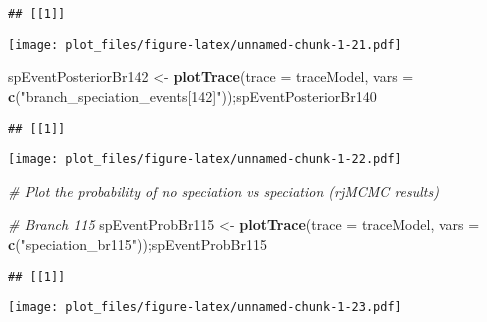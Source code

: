 \documentclass[
]{article}
\newenvironment{Shaded}{\begin{snugshade}}{\end{snugshade}}
\newcommand{\AttributeTok}[1]{\textcolor[rgb]{0.13,0.29,0.53}{#1}}
\newcommand{\CommentTok}[1]{\textcolor[rgb]{0.56,0.35,0.01}{\textit{#1}}}
\newcommand{\FunctionTok}[1]{\textcolor[rgb]{0.13,0.29,0.53}{\textbf{#1}}}
\newcommand{\NormalTok}[1]{#1}
\newcommand{\OtherTok}[1]{\textcolor[rgb]{0.56,0.35,0.01}{#1}}
\newcommand{\StringTok}[1]{\textcolor[rgb]{0.31,0.60,0.02}{#1}}
\begin{document}
\begin{verbatim}
## [[1]]
\end{verbatim}

\texttt{[image: plot\_files/figure-latex/unnamed-chunk-1-21.pdf]}

\begin{Shaded}
\begin{Highlighting}[]
\NormalTok{spEventPosteriorBr142 }\OtherTok{\textless{}{-}} \FunctionTok{plotTrace}\NormalTok{(}\AttributeTok{trace =}\NormalTok{ traceModel, }
                              \AttributeTok{vars =} \FunctionTok{c}\NormalTok{(}\StringTok{"branch\_speciation\_events[142]"}\NormalTok{));spEventPosteriorBr140}
\end{Highlighting}
\end{Shaded}

\begin{verbatim}
## [[1]]
\end{verbatim}

\texttt{[image: plot\_files/figure-latex/unnamed-chunk-1-22.pdf]}

\begin{Shaded}
\begin{Highlighting}[]
\CommentTok{\# Plot the probability of no speciation vs speciation (rjMCMC results)}

\CommentTok{\# Branch 115}
\NormalTok{spEventProbBr115 }\OtherTok{\textless{}{-}} \FunctionTok{plotTrace}\NormalTok{(}\AttributeTok{trace =}\NormalTok{ traceModel, }
                              \AttributeTok{vars =} \FunctionTok{c}\NormalTok{(}\StringTok{"speciation\_br115"}\NormalTok{));spEventProbBr115}
\end{Highlighting}
\end{Shaded}

\begin{verbatim}
## [[1]]
\end{verbatim}

\texttt{[image: plot\_files/figure-latex/unnamed-chunk-1-23.pdf]}
\end{document}
